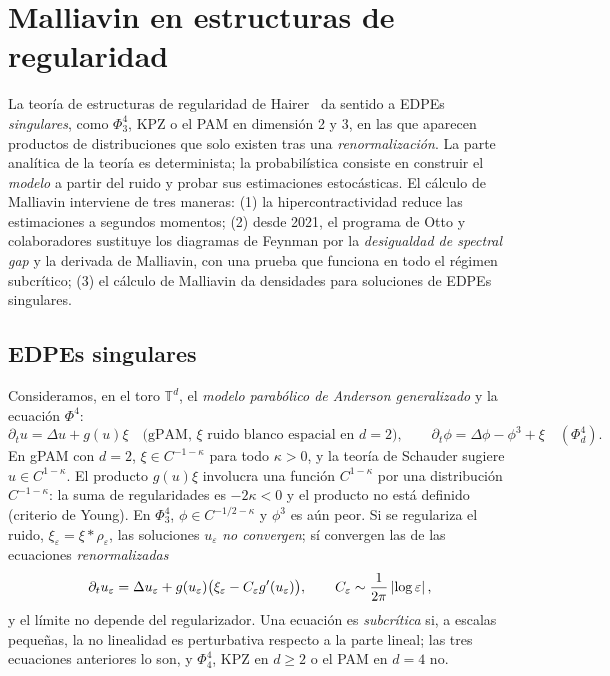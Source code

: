 \chapter{Malliavin en estructuras de regularidad}\label{cap:estructuras}

\begin{panorama}
La teoría de estructuras de regularidad de Hairer~\cite{Hairer14} da sentido a EDPEs \emph{singulares},
como $\Phi^4_3$, KPZ o el PAM en dimensión 2 y 3, en las que aparecen productos de distribuciones
que solo existen tras una \emph{renormalización}. La parte analítica de la teoría es
determinista; la probabilística consiste en construir el \emph{modelo} a partir del ruido y probar
sus estimaciones estocásticas. El cálculo de Malliavin interviene de tres maneras: (1)
la hipercontractividad reduce las estimaciones a segundos momentos; (2) desde 2021, el
programa de Otto y colaboradores sustituye los diagramas de Feynman por la \emph{desigualdad
de spectral gap} y la derivada de Malliavin, con una prueba que funciona en todo el régimen
subcrítico; (3) el cálculo de Malliavin da densidades para soluciones de EDPEs singulares.
\end{panorama}

\section{EDPEs singulares}
Consideramos, en el toro $\mathbb T^d$, el \emph{modelo parabólico de Anderson generalizado} y la ecuación $\Phi^4$:
\[
  \partial_tu=\Delta u+g(u)\xi\quad\text{(gPAM, $\xi$ ruido blanco espacial en $d=2$)},\qquad\partial_t\phi=\Delta\phi-\phi^3+\xi\quad(\Phi^4_d).
\]
En gPAM con $d=2$, $\xi\in C^{-1-\kappa}$ para todo $\kappa>0$, y la teoría de Schauder sugiere $u\in C^{1-\kappa}$. El
producto $g(u)\xi$ involucra una función $C^{1-\kappa}$ por una distribución $C^{-1-\kappa}$: la suma de regularidades
es $-2\kappa<0$ y el producto no está definido (criterio de Young). En $\Phi^4_3$, $\phi\in C^{-1/2-\kappa}$ y $\phi^3$ es aún
peor. Si se regulariza el ruido, $\xi_\varepsilon=\xi*\rho_\varepsilon$, las soluciones $u_\varepsilon$ \emph{no convergen}; sí convergen las de
las ecuaciones \emph{renormalizadas}
\[
  \partial_tu_\varepsilon=\Delta u_\varepsilon+g(u_\varepsilon)\big(\xi_\varepsilon-C_\varepsilon g'(u_\varepsilon)\big),\qquad C_\varepsilon\sim\frac1{2\pi}\left\lvert \log\varepsilon\right\rvert,
\]
y el límite no depende del regularizador. Una ecuación es \emph{subcrítica} si, a escalas pequeñas, la
no linealidad es perturbativa respecto a la parte lineal; las tres ecuaciones anteriores lo son, y
$\Phi^4_4$, KPZ en $d\ge2$ o el PAM en $d=4$ no.

